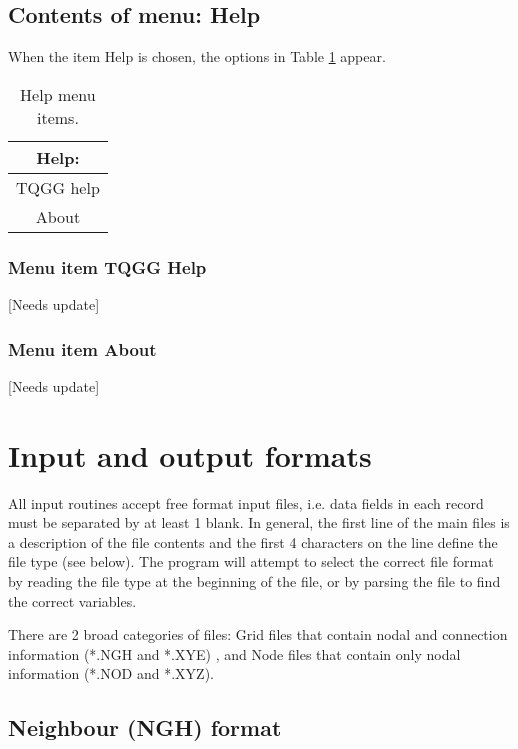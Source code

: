 \documentclass{article}
\begin{document}
\subsection{Contents of menu: Help}
When the item Help is chosen, the options in Table \ref{tab:HELP} appear.

\begin{table}[htb!]
 \caption{Help menu items.}
  \begin{center}
   \begin{tabular}{|c|}
    \hline
Help:\\     \hline
TQGG help \\
About \\
    \hline
   \end{tabular}
   \label{tab:HELP}
  \end{center}
\end{table}


\subsubsection[Menu item TQGG Help]{Menu item TQGG Help}
[Needs update]

\subsubsection[Menu item About]{Menu item About}
[Needs update]



\section{Input and output formats} \label{sec:formats}

All input routines accept free format input files, i.e. data fields in each record must be separated by at least 1 blank.
In general, the first line of the main files is a description of the file contents and the first 4 characters
on the line define the file type (see below). The program will attempt to select the correct file format
by reading the file type at the beginning of the file, or by parsing the file to find the correct variables.

There are 2 broad categories of files: Grid files that contain nodal and connection information (*.NGH and *.XYE)
, and Node files that contain only nodal information (*.NOD and *.XYZ). 

\newpage
\subsection[Neighbour (NGH) format]{Neighbour (NGH) format}
\end{document}
